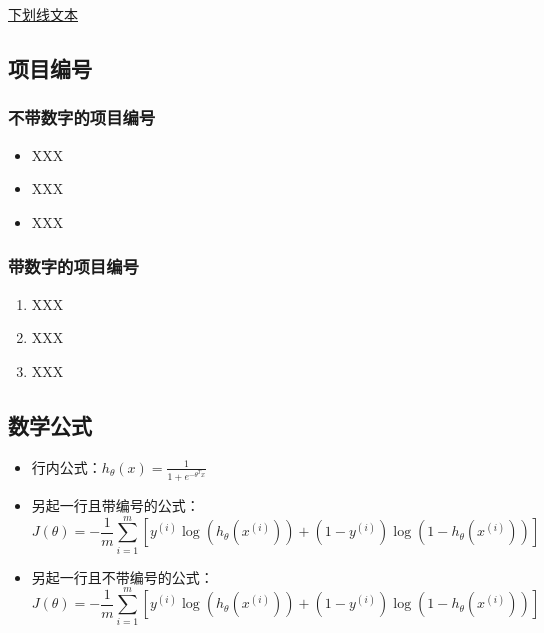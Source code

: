 \documentclass[hyperref,a4paper,UTF8]{ctexart}
\begin{document}
\underline{下划线文本}

\subsection{项目编号}

\subsubsection{不带数字的项目编号}
\begin{itemize}
    \item XXX
    \item XXX
    \item XXX
\end{itemize}

\subsubsection{带数字的项目编号}
\begin{enumerate}
    \item XXX
    \item XXX
    \item XXX
\end{enumerate}

\subsection{数学公式}

\begin{itemize}
    \item 行内公式：$h_\theta(x) = \frac{1}{1 + e^{-\theta^Tx}}$
    \item 另起一行且带编号的公式：
          \begin{equation}
              J(\theta) = -\frac{1}{m}\sum_{i=1}^{m}[y^{(i)}\log(h_\theta(x^{(i)})) + (1-y^{(i)})\log(1-h_\theta(x^{(i)}))]
          \end{equation}

    \item 另起一行且不带编号的公式：
          \begin{equation*}
              J(\theta) = -\frac{1}{m}\sum_{i=1}^{m}[y^{(i)}\log(h_\theta(x^{(i)})) + (1-y^{(i)})\log(1-h_\theta(x^{(i)}))]
          \end{equation*}
\end{itemize}
\end{document}
